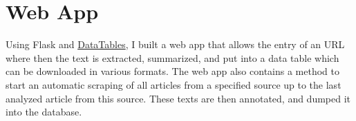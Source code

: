 \section{Web App}
  Using Flask and \href{https://www.datatables.net}{DataTables}, I built a web app that allows the entry of an URL where then the text is extracted, summarized, and put into a data table which can be downloaded in various formats.
  The web app also contains a method to start an automatic scraping of all articles from a specified source up to the last analyzed article from this source. These texts are then annotated, and dumped it into the database.

